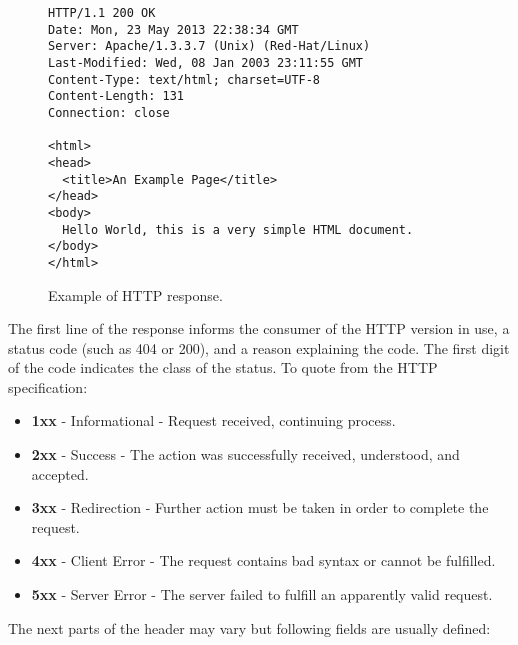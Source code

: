 \documentclass[thesis=M,english]{FITthesis}[2012/10/20]
\begin{document}
\begin{figure}
\begin{lstlisting}
HTTP/1.1 200 OK
Date: Mon, 23 May 2013 22:38:34 GMT
Server: Apache/1.3.3.7 (Unix) (Red-Hat/Linux)
Last-Modified: Wed, 08 Jan 2003 23:11:55 GMT
Content-Type: text/html; charset=UTF-8
Content-Length: 131
Connection: close

<html>
<head>
  <title>An Example Page</title>
</head>
<body>
  Hello World, this is a very simple HTML document.
</body>
</html>

\end{lstlisting}
\caption{Example of HTTP response.}
\label{httpResponse}
\end{figure}

\lstset{ 
  language=Java,
}

The first line of the response informs the consumer of the HTTP version in use, a status code (such as 404 or 200), and a reason explaining the code. The first digit of the code indicates the class of the status. To quote from the HTTP specification\cite{http}:

\begin{itemize}
\item \textbf{1xx} - Informational - Request received, continuing process.
\item \textbf{2xx} - Success - The action was successfully received, understood, and accepted.
\item \textbf{3xx} - Redirection - Further action must be taken in order to complete the request.
\item \textbf{4xx} - Client Error - The request contains bad syntax or cannot be fulfilled.
\item \textbf{5xx} - Server Error - The server failed to fulfill an apparently valid request.
\end{itemize}

The next parts of the header may vary but following fields are usually defined:
\end{document}
